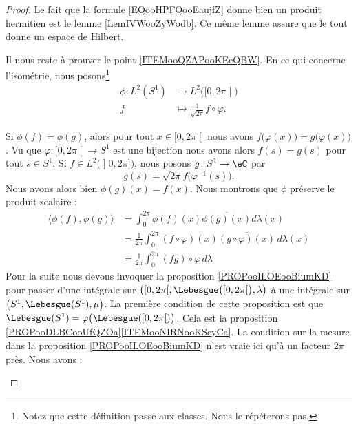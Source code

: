\begin{proof}
	Le fait que la formule \eqref{EQooHPFQooEaujfZ} donne bien un produit hermitien est le lemme \ref{LemIVWooZyWodb}. Ce même lemme assure que le tout donne un espace de Hilbert.

	Il nous reste à prouver le point \ref{ITEMooQZAPooKEeQBW}. En ce qui concerne l'isométrie, nous posons\footnote{Notez que cette définition passe aux classes. Nous le répéterons pas.}
	\begin{equation}
		\begin{aligned}
			\phi\colon L^2(S^1) & \to L^2\big( \mathopen[ 0 , 2\pi \mathclose[ \big) \\
			f                   & \mapsto \frac{1}{ \sqrt{ 2\pi } }f\circ \varphi.
		\end{aligned}
	\end{equation}
	\begin{subproof}
		\spitem[Injection]
		Si \( \phi(f)=\phi(g)\), alors pour tout \( x\in\mathopen[ 0 , 2\pi \mathclose[\) nous avons \( f\big( \varphi(x) \big)=g\big( \varphi(x) \big)\). Vu que \( \varphi\colon \mathopen[ 0 , 2\pi \mathclose[\to S^1\) est une bijection nous avons alors \( f(s)=g(s)\) pour tout \( s\in S^1\).
		\spitem[Surjection]
		Si \( f\in L^2\big( \mathopen] 0 , 2\pi \mathclose] \big)\), nous posons \( g\colon S^1\to \eC\) par
		\begin{equation}
			g(s)=\sqrt{ 2\pi }f\big( \varphi^{-1}(s) \big).
		\end{equation}
		Nous avons alors bien \( \phi(g)(x)=f(x)\).
		\spitem[Isométrie]
		Nous montrons que \( \phi\) préserve le produit scalaire :
		\begin{subequations}        \label{SUBEQSooRYYHooPcLXHN}
			\begin{align}
				\langle \phi(f), \phi(g)\rangle & =\int_0^{2\pi}\phi(f)(x)\overline{ \phi(g)(x) }d\lambda(x)                                   \\
				                                & =\frac{1}{ 2\pi }\int_0^{2\pi}(f\circ\varphi)(x)\overline{ (g\circ\varphi)(x) }\,d\lambda(x) \\
				                                & =\frac{1}{ 2\pi }\int_0^{2\pi}(fg)\circ\varphi\, d\lambda
			\end{align}
		\end{subequations}
		Pour la suite nous devons invoquer la proposition \ref{PROPooILOEooBiumKD} pour passer d'une intégrale sur \( \big( \mathopen[ 0 , 2\pi \mathclose[,\Lebesgue\big( \mathopen[ 0 , 2\pi \mathclose[ \big),\lambda \big)\) à une intégrale sur \( \big( S^1,\Lebesgue(S^1), \mu \big)\). La première condition de cette proposition est que \( \Lebesgue(S^1)=\varphi\big( \Lebesgue(\mathopen[ 0 , 2\pi \mathclose[) \big)\). Cela est la proposition \ref{PROPooDLBCooUfQZOa}\ref{ITEMooNIRNooKSeyCa}. La condition sur la mesure dans la proposition \ref{PROPooILOEooBiumKD} n'est vraie ici qu'à un facteur \( 2\pi\) près. Nous avons :

\end{subproof}
\end{proof}
